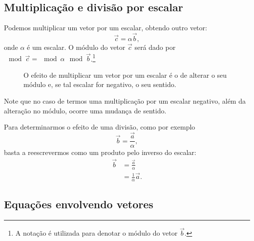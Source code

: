 \subsection{Multiplicação e divisão por escalar}

Podemos multiplicar um vetor por um escalar, obtendo outro vetor:
\begin{equation}
  \vec{c} = \alpha\vec{b},
\end{equation}
%
onde $\alpha$ é um escalar. O módulo do vetor $\vec{c}$ será dado por $\mod{\vec{c}} = \mod{\alpha}\mod{\vec{b}}$.\footnote{A notação  é utilizada para denotar o módulo do vetor $\vec{b}$.}

\begin{figure}
\centering
{}
\caption{O efeito de multiplicar um vetor por um escalar é o de alterar o seu módulo e, se tal escalar for negativo, o seu sentido.}
\end{figure}

\noindent{}Note que no caso de termos uma multiplicação por um escalar negativo, além da alteração no módulo, ocorre uma mudança de sentido.

Para determinarmos o efeito de uma divisão, como por exemplo
\begin{equation}
    \vec{b} = \frac{\vec{a}}{\alpha},
\end{equation}
%
basta a reescrevermos como um produto pelo inverso do escalar:
\begin{align}
    \vec{b} &= \frac{\vec{a}}{\alpha} \\
    &= \frac{1}{\alpha} \vec{a}.
\end{align}

\subsection{Equações envolvendo vetores}

